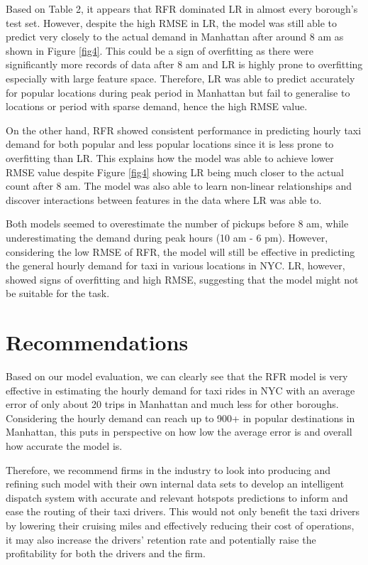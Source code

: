 \documentclass[11pt]{article}
\begin{document}
Based on Table 2, it appears that RFR dominated LR in almost every borough's test set. However, despite the high RMSE in LR, the model was still able to predict very closely to the actual demand in Manhattan after around 8 am as shown in Figure \ref{fig4}. This could be a sign of overfitting as there were significantly more records of data after 8 am and LR is highly prone to overfitting especially with large feature space. Therefore, LR was able to predict accurately for popular locations during peak period in Manhattan but fail to generalise to locations or period with sparse demand, hence the high RMSE value.

On the other hand, RFR showed consistent performance in predicting hourly taxi demand for both popular and less popular locations since it is less prone to overfitting than LR. This explains how the model was able to achieve lower RMSE value despite Figure \ref{fig4} showing LR being much closer to the actual count after 8 am. The model was also able to learn non-linear relationships and discover interactions between features in the data where LR was able to.

Both models seemed to overestimate the number of pickups before 8 am, while underestimating the demand during peak hours (10 am - 6 pm). However, considering the low RMSE of RFR, the model will still be effective in predicting the general hourly demand for taxi in various locations in NYC. LR, however, showed signs of overfitting and high RMSE, suggesting that the model might not be suitable for the task.


\section{Recommendations}
Based on our model evaluation, we can clearly see that the RFR model is very effective in estimating the hourly demand for taxi rides in NYC with an average error of only about 20 trips in Manhattan and much less for other boroughs. Considering the hourly demand can reach up to 900+ in popular destinations in Manhattan, this puts in perspective on how low the average error is and overall how accurate the model is.

Therefore, we recommend firms in the industry to look into producing and refining such model with their own internal data sets to develop an intelligent dispatch system with accurate and relevant hotspots predictions to inform and ease the routing of their taxi drivers. This would not only benefit the taxi drivers by lowering their cruising miles and effectively reducing their cost of operations, it may also increase the drivers' retention rate and potentially raise the profitability for both the drivers and the firm. 
\end{document}
